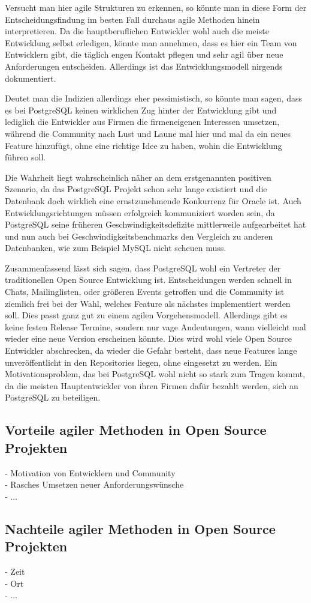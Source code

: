 Versucht man hier agile Strukturen zu erkennen, so könnte man in diese Form der Entscheidungsfindung im besten Fall durchaus agile Methoden hinein interpretieren. Da die hauptberuflichen Entwickler wohl auch die meiste Entwicklung selbst erledigen, könnte man annehmen, dass es hier ein Team von Entwicklern gibt, die täglich engen Kontakt pflegen und sehr agil über neue Anforderungen entscheiden. Allerdings ist das Entwicklungsmodell nirgends dokumentiert.

Deutet man die Indizien allerdings eher pessimistisch, so könnte man sagen, dass es bei PostgreSQL keinen wirklichen Zug hinter der Entwicklung gibt und lediglich die Entwickler aus Firmen die firmeneigenen Interessen umsetzen, während die Community nach Lust und Laune mal hier und mal da ein neues Feature hinzufügt, ohne eine richtige Idee zu haben, wohin die Entwicklung führen soll.

Die Wahrheit liegt wahrscheinlich näher an dem erstgenannten positiven Szenario, da das PostgreSQL Projekt schon sehr lange existiert und die Datenbank doch wirklich eine ernstzunehmende Konkurrenz für Oracle ist. Auch Entwicklungsrichtungen müssen erfolgreich kommuniziert worden sein, da PostgreSQL seine früheren Geschwindigkeitsdefizite mittlerweile aufgearbeitet hat und nun auch bei Geschwindigkeitsbenchmarks den Vergleich zu anderen Datenbanken, wie zum Beispiel MySQL nicht scheuen muss.

Zusammenfassend lässt sich sagen, dass PostgreSQL wohl ein Vertreter der traditionellen Open Source Entwicklung ist. Entscheidungen werden schnell in Chats, Mailinglisten, oder größeren Events getroffen und die Community ist ziemlich frei bei der Wahl, welches Feature als nächstes implementiert werden soll. Dies passt ganz gut zu einem agilen Vorgehensmodell. Allerdings gibt es keine festen Release Termine, sondern nur vage Andeutungen, wann vielleicht mal wieder eine neue Version erscheinen könnte. Dies wird wohl viele Open Source Entwickler abschrecken, da wieder die Gefahr besteht, dass neue Features lange unveröffentlicht in den Repositories liegen, ohne eingesetzt zu werden. Ein Motivationsproblem, das bei PostgreSQL wohl nicht so stark zum Tragen kommt, da die meisten Hauptentwickler von ihren Firmen dafür bezahlt werden, sich an PostgreSQL zu beteiligen.


\subsection{Vorteile agiler Methoden in Open Source Projekten}
  - Motivation von Entwicklern und Community\\
  - Rasches Umsetzen neuer Anforderungswünsche\\
  - ...
  
\subsection{Nachteile agiler Methoden in Open Source Projekten}
  - Zeit\\
  - Ort\\
  - ...


